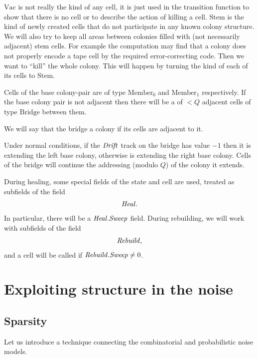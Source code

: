 \documentclass[11pt]{memoir}
\theoremstyle{definition} %
\newcommand{\fld}[1]{\ensuremath{\textit{#1\/}}}
\newcommand{\Vacant}{\mathrm{Vac}}
\newcommand{\Q}{Q}
\newcommand{\Drift}{\fld{Drift}}
\newcommand{\Heal}{\fld{Heal}}
\newcommand{\Rebuild}{\fld{Rebuild}}
\newcommand{\Sweep}{\fld{Sweep}}
\newcommand{\Bridge}{\mathrm{Bridge}}
\newcommand{\Member}{\mathrm{Member}}
\newcommand{\Stem}{\mathrm{Stem}}
\begin{document}
\( \Vacant \) is not really the kind of any cell, it is just used in the transition function
to show that there is no cell or to describe the action of killing a cell.
\( \Stem \) is the kind of newly created cells that do not participate in any known colony structure.
We will also try to keep all areas between colonies filled with (not necessarily adjacent)
stem cells.
For example the computation may find that a colony does not properly encode
a tape cell by the required error-correcting code.
Then we want to ``kill'' the whole colony.
This will happen by turning the kind of each of its cells to \( \Stem \).

Cells of the base colony-pair are of type \( \Member_{0} \) and \( \Member_{1} \) respectively.
If the base colony pair is not adjacent then there will be a  of \( <\Q \)
adjacent cells of type \( \Bridge \) between them.

\begin{definition}\label{def:extends}
We will say that the bridge  a colony if its cells are adjacent to it.  
\end{definition}
Under normal conditions,  
if the \( \Drift \) track on the bridge has value \( -1 \) then it is extending the left base
colony, otherwise is extending the right base colony.
Cells of the bridge will continue the addressing (modulo \( \Q \)) of the colony it extends.

During healing, some special fields of the state and cell are used, treated as subfields of the field
 \begin{align}\label{eq:Heal}
   \Heal.
 \end{align} 
In particular, there will be a \( \Heal.\Sweep \) field.
During rebuilding, we will work with subfields of the field
\begin{align*}
 \Rebuild,   
 \end{align*}
and a cell will be called  if \( \Rebuild.\Sweep\ne 0 \).


\section{Exploiting structure in the noise}\label{sec:noise}

\subsection{Sparsity}\label{sec:sparsity}
Let us introduce a technique connecting the combinatorial and probabilistic
noise models.
\end{document}

